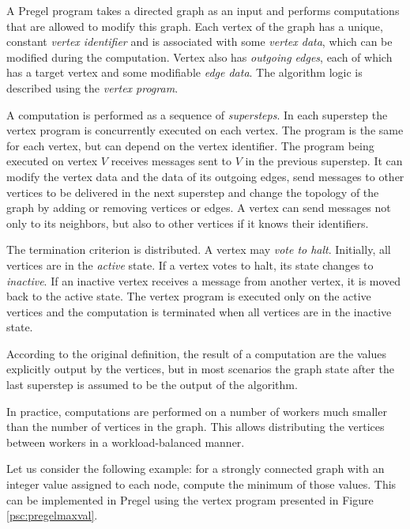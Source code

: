 A Pregel program takes a directed graph as an input and performs computations that are allowed to modify this graph.
Each vertex of the graph has a unique, constant \emph{vertex identifier} and is associated with some \emph{vertex data}, which can be modified during the computation. Vertex also has \emph{outgoing edges}, each of which has a target vertex and some modifiable \emph{edge data}. The algorithm logic is described using the \emph{vertex program}.

A computation is performed as a sequence of \emph{supersteps}. In each superstep the vertex program is concurrently executed on each vertex. The program is the same for each vertex, but can depend on the vertex identifier. The program being executed on vertex $V$ receives messages sent to $V$ in the previous superstep. It can modify the vertex data and the data of its outgoing edges, send messages to other vertices to be delivered in the next superstep and change the topology of the graph by adding or removing vertices or edges. A vertex can send messages not only to its neighbors, but also to other vertices if it knows their identifiers.

The termination criterion is distributed. A vertex may \emph{vote to halt}. Initially, all vertices are in the \emph{active} state. If a vertex votes to halt, its state changes to \emph{inactive}. If an inactive vertex receives a message from another vertex, it is moved back to the active state. The vertex program is executed only on the active vertices and the computation is terminated when all vertices are in the inactive state.

According to the original definition, the result of a computation are the values explicitly output by the vertices, but in most scenarios the graph state after the last superstep is assumed to be the output of the algorithm.

In practice, computations are performed on a number of workers much smaller than the number of vertices in the graph. This allows distributing the vertices between workers in a workload-balanced manner.

Let us consider the following example: for a strongly connected graph with an integer value assigned to each node, compute the minimum of those values. This can be implemented in Pregel using the vertex program presented in Figure \ref{psc:pregelmaxval}.


